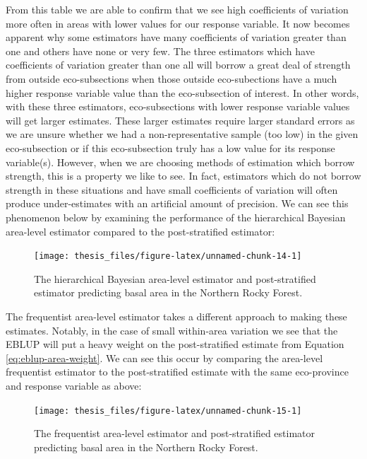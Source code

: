 \documentclass[12pt,twoside]{reedthesis}
\begin{document}
From this table we are able to confirm that we see high coefficients of variation more often in areas with lower values for our response variable. It now becomes apparent why some estimators have many coefficients of variation greater than one and others have none or very few. The three estimators which have coefficients of variation greater than one all will borrow a great deal of strength from outside eco-subsections when those outside eco-subections have a much higher response variable value than the eco-subsection of interest. In other words, with these three estimators, eco-subsections with lower response variable values will get larger estimates. These larger estimates require larger standard errors as we are unsure whether we had a non-representative sample (too low) in the given eco-subsection or if this eco-subsection truly has a low value for its response variable(s). However, when we are choosing methods of estimation which borrow strength, this is a property we like to see. In fact, estimators which do not borrow strength in these situations and have small coefficients of variation will often produce under-estimates with an artificial amount of precision. We can see this phenomenon below by examining the performance of the hierarchical Bayesian area-level estimator compared to the post-stratified estimator:
\begin{figure}

{\centering \texttt{[image: thesis\_files/figure-latex/unnamed-chunk-14-1]} 

}

\caption[HB Area and Post-stratified estimates in M333]{The hierarchical Bayesian area-level estimator and post-stratified estimator predicting basal area in the Northern Rocky Forest.}\label{fig:unnamed-chunk-14}
\end{figure}
The frequentist area-level estimator takes a different approach to making these estimates. Notably, in the case of small within-area variation we see that the EBLUP will put a heavy weight on the post-stratified estimate from Equation \eqref{eq:eblup-area-weight}. We can see this occur by comparing the area-level frequentist estimator to the post-stratified estimate with the same eco-province and response variable as above:
\begin{figure}

{\centering \texttt{[image: thesis\_files/figure-latex/unnamed-chunk-15-1]} 

}

\caption[EBLUP area-level and Post-stratified estimates in M333]{The frequentist area-level estimator and post-stratified estimator predicting basal area in the Northern Rocky Forest.}\label{fig:unnamed-chunk-15}
\end{figure}
\end{document}
